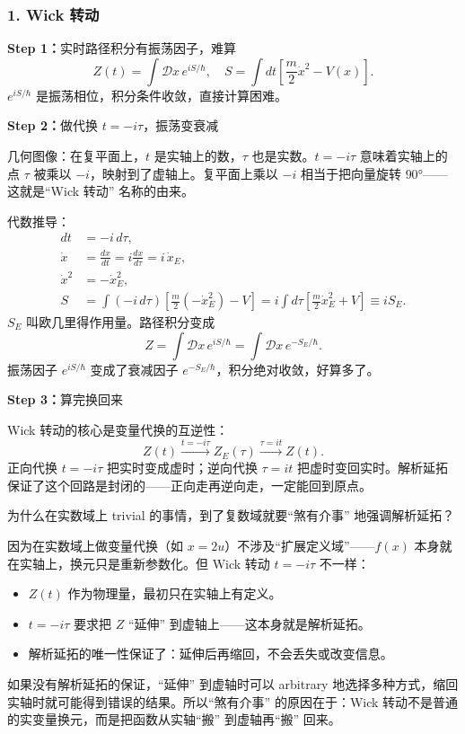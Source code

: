 \begin{derivationbox}[解析延拓与积分路径的选择]

\subsubsection*{1. Wick 转动}

\textbf{Step 1：}实时路径积分有振荡因子，难算
\[
Z(t) = \int \mathcal{D}x \, e^{iS/\hbar}, \quad S = \int dt \left[ \frac{m}{2}\dot{x}^2 - V(x) \right].
\]
$e^{iS/\hbar}$ 是振荡相位，积分条件收敛，直接计算困难。

\textbf{Step 2：}做代换 $t = -i\tau$，振荡变衰减

几何图像：在复平面上，$t$ 是实轴上的数，$\tau$ 也是实数。$t = -i\tau$ 意味着实轴上的点 $\tau$ 被乘以 $-i$，映射到了虚轴上。复平面上乘以 $-i$ 相当于把向量旋转 $90°$——这就是``Wick 转动'' 名称的由来。

代数推导：
\begin{align*}
dt &= -i\, d\tau, \\
\dot{x} &= \frac{dx}{dt} = i \frac{dx}{d\tau} = i\, \dot{x}_E, \\
\dot{x}^2 &= -\dot{x}_E^2, \\
S &= \int (-i\, d\tau) \left[ \frac{m}{2}(-\dot{x}_E^2) - V \right] = i \int d\tau \left[ \frac{m}{2}\dot{x}_E^2 + V \right] \equiv i S_E.
\end{align*}
$S_E$ 叫欧几里得作用量。路径积分变成
\[
Z = \int \mathcal{D}x \, e^{iS/\hbar} = \int \mathcal{D}x \, e^{-S_E/\hbar}.
\]
振荡因子 $e^{iS/\hbar}$ 变成了衰减因子 $e^{-S_E/\hbar}$，积分绝对收敛，好算多了。

\textbf{Step 3：}算完换回来

Wick 转动的核心是变量代换的互逆性：
\[
Z(t) \xrightarrow{t = -i\tau} Z_E(\tau) \xrightarrow{\tau = it} Z(t).
\]
正向代换 $t = -i\tau$ 把实时变成虚时；逆向代换 $\tau = it$ 把虚时变回实时。解析延拓保证了这个回路是封闭的——正向走再逆向走，一定能回到原点。

为什么在实数域上 trivial 的事情，到了复数域就要``煞有介事'' 地强调解析延拓？

因为在实数域上做变量代换（如 $x = 2u$）不涉及``扩展定义域''——$f(x)$ 本身就在实轴上，换元只是重新参数化。但 Wick 转动 $t = -i\tau$ 不一样：
\begin{itemize}
    \item $Z(t)$ 作为物理量，最初只在实轴上有定义。
    \item $t = -i\tau$ 要求把 $Z$ ``延伸'' 到虚轴上——这本身就是解析延拓。
    \item 解析延拓的唯一性保证了：延伸后再缩回，不会丢失或改变信息。
\end{itemize}
如果没有解析延拓的保证，``延伸'' 到虚轴时可以 arbitrary 地选择多种方式，缩回实轴时就可能得到错误的结果。所以``煞有介事'' 的原因在于：Wick 转动不是普通的实变量换元，而是把函数从实轴``搬'' 到虚轴再``搬'' 回来。


\end{derivationbox}

